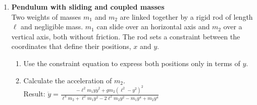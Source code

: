 \documentclass[11pt, a4paper, twoside]{article}
\begin{document}
\begin{enumerate}
	\item 
	\begin{minipage}[t][2.3cm]{0.75\textwidth}
		\textbf{Pendulum with sliding and coupled masses}\\ 
		Two weights of masses \(m_1\) and \(m_2\) are linked together by a rigid rod of length \(\ell\) and negligible mass.
		\(m_1\) can slide over an horizontal axis and \(m_2\) over a vertical axis, both without friction.
		The rod sets a constraint between the coordinates that define their positions, \(x\) and \(y\).
	\end{minipage}
	\begin{minipage}[c][1cm][t]{0.25\textwidth}
		
	\end{minipage}
	\begin{enumerate}
		\item Use the constraint equation to express both positions only in terms of \(y\).
		\item Calculate the acceleration of \(m_2\).\\
		Result:
			$\ddot{y} = \frac{- \ell^{2} m_{1} y \dot{y}^{2} + g m_{2} \left(\ell^{2} - y^{2}\right)^{2}}{\ell^{4} m_{2} + \ell^{2} m_{1} y^{2} - 2 \ell^{2} m_{2} y^{2} - m_{1} y^{4} + m_{2} y^{4}}$
			\qquad
	\end{enumerate}
	


\end{enumerate}
\end{document}
